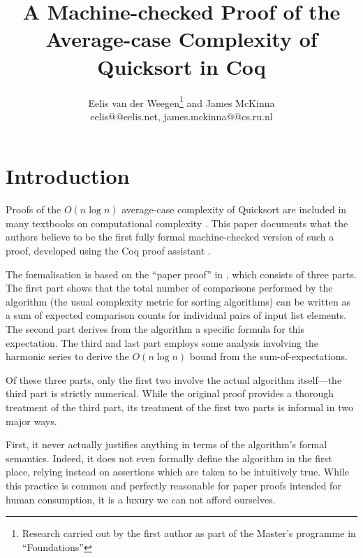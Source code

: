 \documentclass[runningheads]{llncs}
\newcommand{\eelis}{Eelis van der Weegen}
\newcommand{\james}{James McKinna}
\newcommand{\thetitle}{A Machine-checked Proof of the Average-case Complexity of Quicksort in Coq}
\begin{document}
\nocite{*}

\title{\thetitle}

\authorrunning{\em}
\titlerunning{\em}

\author{\eelis\thanks{Research carried out by the first author as part of the Master's programme in ``Foundations''} and \james \\
eelis@@eelis.net, james.mckinna@@cs.ru.nl}


\maketitle

\begin{abstract}
  
\end{abstract}

\section{Introduction}
\label{intro}

Proofs of the $O(n \log n)$ average-case complexity of Quicksort \cite{HoareQuick} are included in many textbooks on computational complexity \cite[for example]{introtoalgos}.
This paper documents what the authors believe to be the first fully formal machine-checked version of such a proof, developed using the Coq proof assistant \cite{coq}.

The formalisation is based on the ``paper proof'' in \cite{introtoalgos}, which consists of three parts. The first part shows that the total number of comparisons performed by the algorithm (the usual complexity metric for sorting algorithms) can be written as a sum of expected comparison counts for individual pairs of input list elements. The second part derives from the algorithm a specific formula for this expectation. The third and last part employs some analysis involving the harmonic series to derive the $O(n \log n)$ bound from the sum-of-expectations.

Of these three parts, only the first two involve the actual algorithm itself---the third part is strictly numerical. While the original proof provides a thorough treatment of the third part, its treatment of the first two parts is informal in two major ways.

First, it never actually justifies anything in terms of the algorithm's formal semantics. Indeed, it does not even formally define the algorithm in the first place, relying instead on assertions which are taken to be intuitively true. While this practice is common and perfectly reasonable for paper proofs intended for human consumption, it is a luxury we can not afford ourselves.
\end{document}
